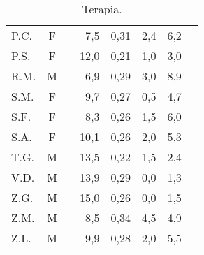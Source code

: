 \begin{table}[!h]
\begin{center}
\begin{tabular}{lccrcccl}
P.C.	& F &  		 & 7,5   	&  0,31     	& 2,4                 & 6,2  \\
P.S.	& F &  		 & 12,0  	&  0,21     	& 1,0                 & 3,0  \\
R.M.	& M & \checkmark & 6,9   	&  0,29     	& 3,0                 & 8,9  \\
S.M.	& F &  	  	 & 9,7   	&  0,27     	& 0,5                 & 4,7  \\
S.F.	& F &  		 & 8,3   	&  0,26     	& 1,5                 & 6,0  \\
S.A.	& F &  		 & 10,1  	&  0,26     	& 2,0                 & 5,3  \\
T.G.    & M &            & 13,5         &  0,22         & 1,5                 & 2,4  \\
V.D.	& M &  		 & 13,9  	&  0,29     	& 0,0                 & 1,3  \\
Z.G.	& M &  		 & 15,0  	&  0,26     	& 0,0                 & 1,5  \\
Z.M.	& M &  		 & 8,5   	&  0,34     	& 4,5                 & 4,9  \\
Z.L.	& M &  		 & 9,9   	&  0,28     	& 2,0                 & 5,5  \\
\bottomrule
\end{tabular}
\end{center}
\caption{Terapia.}
\label{tab:Terapia}
\end{table}


